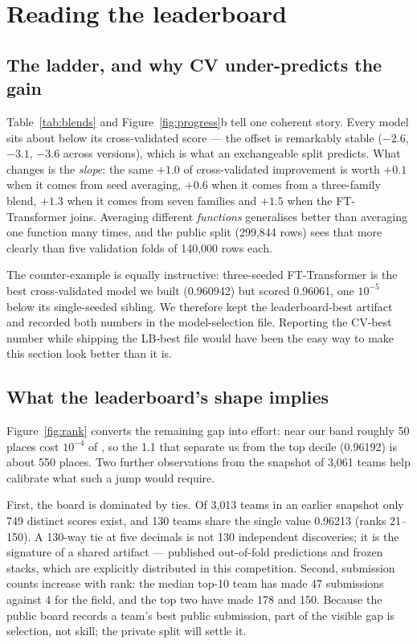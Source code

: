 \section{Reading the leaderboard}
\label{sec:lb}

\subsection{The ladder, and why CV under-predicts the gain}
Table~\ref{tab:blends} and Figure~\ref{fig:progress}b tell one coherent story. Every model sits
about  below its cross-validated score --- the offset is remarkably stable
($-2.6$, $-3.1$, $-3.6$ \dlt{} across versions), which is what an exchangeable split predicts.
What changes is the \emph{slope}: the same $+1.0$ \dlt{} of cross-validated improvement is worth
$+0.1$ \dlt{} when it comes from seed averaging, $+0.6$ when it comes from a three-family blend,
$+1.3$ when it comes from seven families and $+1.5$ when the FT-Transformer joins. Averaging
different \emph{functions} generalises better than averaging one function many times, and the
public split (299{,}844 rows) sees that more clearly than five validation folds of 140{,}000
rows each.

The counter-example is equally instructive: three-seeded FT-Transformer is the best
cross-validated model we built (0.960942) but scored 0.96061, one $10^{-5}$ below its
single-seeded sibling. We therefore kept the leaderboard-best artifact and recorded both
numbers in the model-selection file. Reporting the CV-best number while shipping the LB-best
file would have been the easy way to make this section look better than it is.

\subsection{What the leaderboard's shape implies}
Figure~\ref{fig:rank} converts the remaining gap into effort: near our band roughly 50 places
cost $10^{-4}$ of \auc{}, so the 1.1 \dlt{} that separate us from the top decile (0.96192) is
about 550 places. Two further observations from the snapshot of 3{,}061 teams help calibrate
what such a jump would require.

First, the board is dominated by ties. Of 3{,}013 teams in an earlier snapshot only 749 distinct
scores exist, and 130 teams share the single value 0.96213 (ranks 21--150). A 130-way tie at
five decimals is not 130 independent discoveries; it is the signature of a shared artifact ---
published out-of-fold predictions and frozen stacks, which are explicitly distributed in this
competition. Second, submission counts increase with rank: the median top-10 team has made 47
submissions against 4 for the field, and the top two have made 178 and 150. Because the public
board records a team's best public submission, part of the visible gap is selection, not skill;
the private split will settle it.

